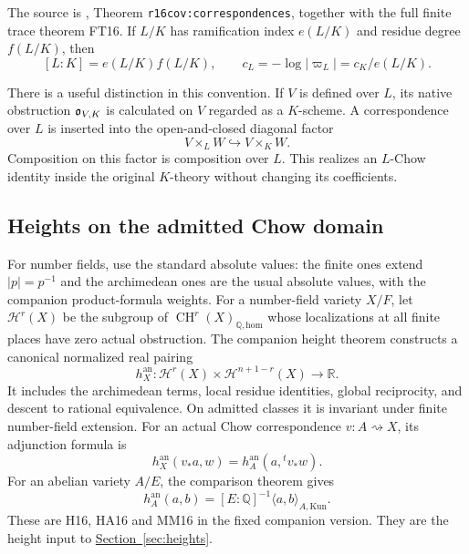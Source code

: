 \documentclass[11pt,a4paper]{article}
\theoremstyle{definition}
\theoremstyle{remark}\newtheorem{remark}[theorem]{Remark}
\numberwithin{equation}{section}
\newcommand{\Q}{\mathbb Q}\newcommand{\R}{\mathbb R}\newcommand{\C}{\mathbb C}
\newcommand{\CH}{\operatorname{CH}}\newcommand{\an}{\mathrm{an}}
\newcommand{\homol}{\mathrm{hom}}\newcommand{\BC}{\mathrm{BC}}
\newcommand{\secref}[1]{\hyperref[#1]{\textcolor{sectionlink}{Section~\ref*{#1}}}}
\begin{document}
The source is \cite{InternalCovariance}, Theorem
\texttt{r16cov:correspondences}, together with the full finite trace
theorem FT16. If $L/K$ has ramification index $e(L/K)$ and residue
degree $f(L/K)$, then
\begin{equation}\label{eq:local-normalization}
 [L:K]=e(L/K)f(L/K),\qquad
 c_L=-\log|\varpi_L|=c_K/e(L/K).
\end{equation}

There is a useful distinction in this convention. If $V$ is defined
over $L$, its native obstruction $\mathfrak o_{V,K}$ is calculated on $V$
regarded as a $K$-scheme. A correspondence over $L$ is inserted into
the open-and-closed diagonal factor
\[
       V\times_L W\hookrightarrow V\times_K W.
\]
Composition on this factor is composition over $L$. This realizes an
$L$-Chow identity inside the original $K$-theory without changing its
coefficients.

\subsection{Heights on the admitted Chow domain}\label{sub:height-input}

For number fields, use the standard absolute values: the finite ones
extend $|p|=p^{-1}$ and the archimedean ones are the usual absolute
values, with the companion product-formula weights. For a
number-field variety $X/F$, let $\mathcal H^r(X)$ be the subgroup
of $\CH^r(X)_{\Q,\homol}$ whose localizations at all finite places
have zero actual obstruction. The companion height theorem
\cite{InternalHeight} constructs a canonical normalized real pairing
\[
 h_X^{\an}:\mathcal H^r(X)\times\mathcal H^{n+1-r}(X)\longrightarrow\R.
\]
It includes the archimedean terms, local residue identities, global
reciprocity, and descent to rational equivalence. On admitted classes
it is invariant under finite number-field extension. For an actual
Chow correspondence $v:A\rightsquigarrow X$, its adjunction formula is
\begin{equation}\label{eq:height-adjunction}
       h_X^{\an}(v_*a,w)=h_A^{\an}(a,{}^tv_*w).
\end{equation}
For an abelian variety $A/E$, the comparison theorem gives
\begin{equation}\label{eq:abelian-comparison}
       h_A^{\an}(a,b)=[E:\Q]^{-1}\langle a,b\rangle_{A,\mathrm{Kun}}.
\end{equation}
These are H16, HA16 and MM16 in the fixed companion version. They
are the height input to \secref{sec:heights}.
\end{document}
